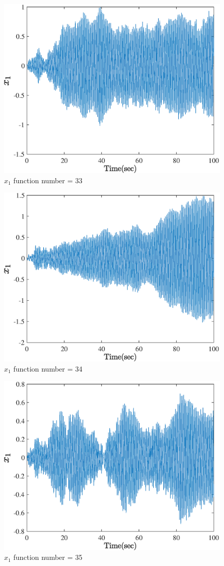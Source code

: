   \begin{figure}[H] 
  	\caption{$x_1$ function number = 33} 
  	\centering 
  	\includegraphics[width=12cm]{../Figure/Q5/part_a/33} 
  \end{figure}
  \begin{figure}[H] 
  	\caption{$x_1$ function number = 34} 
  	\centering 
  	\includegraphics[width=12cm]{../Figure/Q5/part_a/34} 
  \end{figure}
  \begin{figure}[H] 
  	\caption{$x_1$ function number = 35} 
  	\centering 
  	\includegraphics[width=12cm]{../Figure/Q5/part_a/35} 
  \end{figure}
